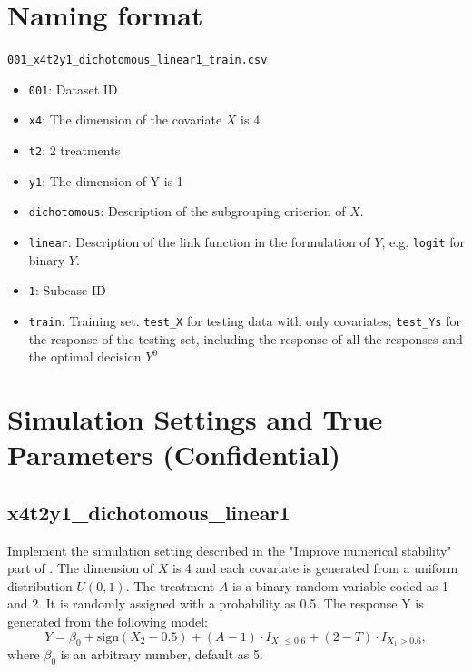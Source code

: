 \documentclass[12pt]{article}
\begin{document}
\section*{Naming format}
\texttt{001\_x4t2y1\_dichotomous\_linear1\_train.csv}
\begin{itemize}
	\item \texttt{001}: Dataset ID
	\item \texttt{x4}: The dimension of the covariate $X$ is 4
	\item \texttt{t2}: 2 treatments
	\item \texttt{y1}: The dimension of Y is 1
	\item \texttt{dichotomous}: Description of the subgrouping criterion of $X$.
	\item \texttt{linear}: Description of the link function in the formulation of $Y$, e.g. \texttt{logit} for binary $Y$.
	\item \texttt{1}: Subcase ID
	\item \texttt{train}: Training set. \texttt{test\_X} for testing data with only covariates; \texttt{test\_Ys} for the response of the testing set, including the response of all the responses and the optimal decision $Y^0$
\end{itemize}
\section*{Simulation Settings and True Parameters (Confidential)} \label{sec.SimSettings}

\subsection*{x4t2y1\_dichotomous\_linear1}
Implement the simulation setting described in the "Improve numerical stability" part of \cite{fu2016estimating}. The dimension of $X$ is 4 and each covariate is generated from a uniform distribution $U(0,1)$. The treatment $A$ is a binary random variable coded as 1 and 2. It is randomly assigned with a probability as 0.5. The response Y is generated from the following model:
\begin{equation*}
Y=\beta_0+\text{sign}(X_2-0.5)+(A-1)\cdot I_{X_1\le 0.6}+(2-T)\cdot I_{X_1>0.6},
\end{equation*} 
where $\beta_0$ is an arbitrary number, default as 5.
\end{document}
